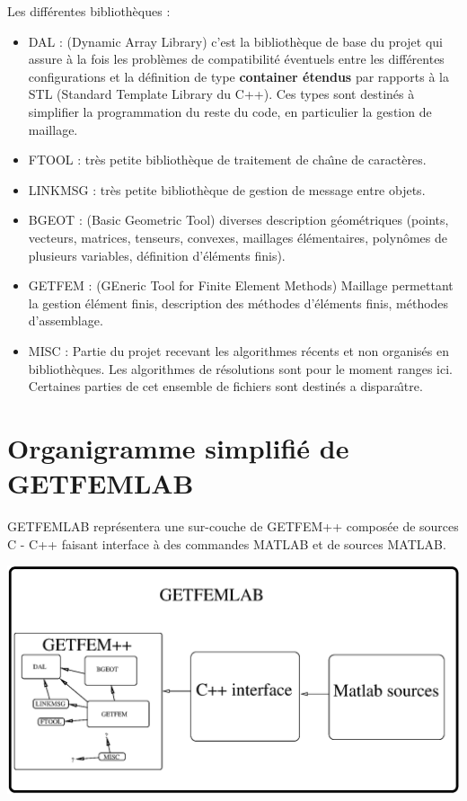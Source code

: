 \documentclass[12pt,a4paper]{../doc}
\begin{document}
{Les diff\'erentes biblioth\`eques :
\begin{itemize}
  \item DAL : (Dynamic Array Library) c'est la biblioth\`eque de base du projet qui assure \`a la fois
    les probl\`emes de compatibilit\'e \'eventuels entre les diff\'erentes configurations et la d\'efinition de type {\bf container \'etendus} par rapports \`a la STL (Standard Template Library du C++). Ces types sont destin\'es \`a simplifier la programmation du reste du code, en particulier la gestion de maillage.\\[0.2cm]
  \item FTOOL : tr\`es petite biblioth\`eque de traitement de cha\^\i ne de caract\`eres.\\[0.2cm]
  \item LINKMSG : tr\`es petite biblioth\`eque de gestion de message entre objets.\\[0.2cm]
  \item BGEOT : (Basic Geometric Tool) diverses description g\'eom\'etriques (points, vecteurs, matrices, tenseurs, convexes, maillages \'el\'ementaires, polyn\^omes de plusieurs variables, d\'efinition d'\'el\'ements finis).\\[0.2cm]
  \item GETFEM : (GEneric Tool for Finite Element Methods) Maillage permettant la gestion \'el\'ement finis, description des m\'ethodes d'\'el\'ements finis, m\'ethodes d'assemblage. \\[0.2cm]
  \item MISC : Partie du projet recevant les algorithmes r\'ecents et non organis\'es en biblioth\`eques. Les algorithmes de r\'esolutions sont pour le moment ranges ici. Certaines parties de cet ensemble de fichiers sont destin\'es a dispara\^\i tre. \\[0.2cm]
\end{itemize}

\section{Organigramme simplifi\'e de GETFEMLAB}
GETFEMLAB repr\'esentera une sur-couche de GETFEM++ compos\'ee de sources C - C++ faisant interface \`a des commandes MATLAB et de sources MATLAB.

\begin{center}
\includegraphics[width=17cm,angle=0]{getfemlab_orga.eps}
\end{center}

}
\end{document}
